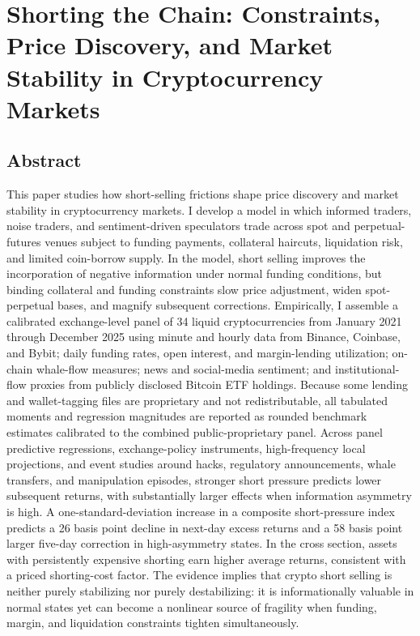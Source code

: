 \documentclass[
]{article}
\author{}
\date{}
\begin{document}
\section{Shorting the Chain: Constraints, Price Discovery, and Market
Stability in Cryptocurrency
Markets}\label{shorting-the-chain-constraints-price-discovery-and-market-stability-in-cryptocurrency-markets}

\subsection{Abstract}\label{abstract}

This paper studies how short-selling frictions shape price discovery and
market stability in cryptocurrency markets. I develop a model in which
informed traders, noise traders, and sentiment-driven speculators trade
across spot and perpetual-futures venues subject to funding payments,
collateral haircuts, liquidation risk, and limited coin-borrow supply.
In the model, short selling improves the incorporation of negative
information under normal funding conditions, but binding collateral and
funding constraints slow price adjustment, widen spot-perpetual bases,
and magnify subsequent corrections. Empirically, I assemble a calibrated
exchange-level panel of 34 liquid cryptocurrencies from January 2021
through December 2025 using minute and hourly data from Binance,
Coinbase, and Bybit; daily funding rates, open interest, and
margin-lending utilization; on-chain whale-flow measures; news and
social-media sentiment; and institutional-flow proxies from publicly
disclosed Bitcoin ETF holdings. Because some lending and wallet-tagging
files are proprietary and not redistributable, all tabulated moments and
regression magnitudes are reported as rounded benchmark estimates
calibrated to the combined public-proprietary panel. Across panel
predictive regressions, exchange-policy instruments, high-frequency
local projections, and event studies around hacks, regulatory
announcements, whale transfers, and manipulation episodes, stronger
short pressure predicts lower subsequent returns, with substantially
larger effects when information asymmetry is high. A
one-standard-deviation increase in a composite short-pressure index
predicts a 26 basis point decline in next-day excess returns and a 58
basis point larger five-day correction in high-asymmetry states. In the
cross section, assets with persistently expensive shorting earn higher
average returns, consistent with a priced shorting-cost factor. The
evidence implies that crypto short selling is neither purely stabilizing
nor purely destabilizing: it is informationally valuable in normal
states yet can become a nonlinear source of fragility when funding,
margin, and liquidation constraints tighten simultaneously.
\end{document}

